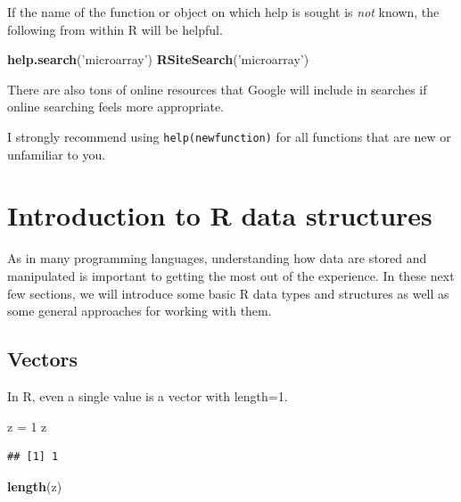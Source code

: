 \documentclass[]{article}
\newenvironment{Shaded}{\begin{snugshade}}{\end{snugshade}}
\newcommand{\KeywordTok}[1]{\textcolor[rgb]{0.13,0.29,0.53}{\textbf{#1}}}
\newcommand{\DecValTok}[1]{\textcolor[rgb]{0.00,0.00,0.81}{#1}}
\newcommand{\StringTok}[1]{\textcolor[rgb]{0.31,0.60,0.02}{#1}}
\newcommand{\NormalTok}[1]{#1}
\theoremstyle{definition}
\theoremstyle{definition}
\theoremstyle{remark}
\begin{document}
If the name of the function or object on which help is sought is
\emph{not} known, the following from within R will be helpful.

\begin{Shaded}
\begin{Highlighting}[]
\KeywordTok{help.search}\NormalTok{(}\StringTok{'microarray'}\NormalTok{)}
\KeywordTok{RSiteSearch}\NormalTok{(}\StringTok{'microarray'}\NormalTok{)}
\end{Highlighting}
\end{Shaded}

There are also tons of online resources that Google will include in
searches if online searching feels more appropriate.

I strongly recommend using \texttt{help(newfunction)} for all functions
that are new or unfamiliar to you.

\section{Introduction to R data
structures}\label{introduction-to-r-data-structures}

As in many programming languages, understanding how data are stored and
manipulated is important to getting the most out of the experience. In
these next few sections, we will introduce some basic R data types and
structures as well as some general approaches for working with them.

\subsection{Vectors}\label{vectors}

In R, even a single value is a vector with length=1.

\begin{Shaded}
\begin{Highlighting}[]
\NormalTok{z =}\StringTok{ }\DecValTok{1}
\NormalTok{z}
\end{Highlighting}
\end{Shaded}

\begin{verbatim}
## [1] 1
\end{verbatim}

\begin{Shaded}
\begin{Highlighting}[]
\KeywordTok{length}\NormalTok{(z)}
\end{Highlighting}
\end{Shaded}
\end{document}
